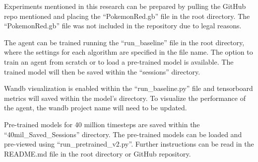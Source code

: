 Experiments mentioned in this research can be prepared by pulling the GitHub repo mentioned and placing the ``PokemonRed.gb'' file in the root directory. The ``PokemonRed.gb'' file was not included in the repository due to legal reasons. 

The agent can be trained running the ``run\_baseline'' file in the root directory, where the settings for each algorithm are specified in the file name. The option to train an agent from scratch or to load a pre-trained model is available. The trained model will then be saved within the ``sessions'' directory.

Wandb visualization is enabled within the ``run\_baseline.py'' file and tensorboard metrics will saved within the model's directory. To visualize the performance of the agent, the wandb project name will need to be updated.

Pre-trained models for 40 million timesteps are saved within the ``40mil\_Saved\_Sessions'' directory. The pre-trained models can be loaded and pre-viewed using ``run\_pretrained\_v2.py''. Further instructions can be read in the README.md file in the root directory or GitHub repository.